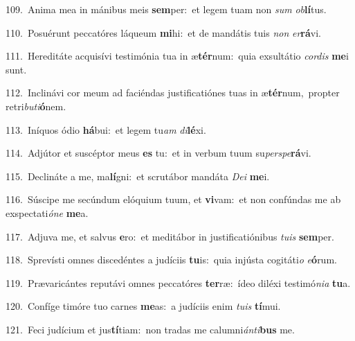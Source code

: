 {\numbfont\textcolor{\numbcolor}{109.}}~Anima mea in mánibus meis \textbf{sem}\-per:~\star et legem tuam non \textit{sum} \textit{ob}\-\textbf{lí}tus.\par
{\numbfont\textcolor{\numbcolor}{110.}}~Posuérunt peccatóres láqueum \textbf{mi}\-hi:~\star et de mandátis tuis \textit{non} \textit{er}\-\textbf{rá}vi.\par
{\numbfont\textcolor{\numbcolor}{111.}}~Hereditáte acquisívi testimónia tua in æ\-\textbf{tér}\-num:~\star quia exsultátio \textit{cor}\-\textit{dis} \textbf{me}\-i sunt.\par
{\numbfont\textcolor{\numbcolor}{112.}}~Inclinávi cor meum ad faciéndas justificatiónes tuas in æ\-\textbf{tér}\-num,~\star propter retri\-\textit{bu}\-\textit{ti}\textbf{ó}nem.\par
{\numbfont\textcolor{\numbcolor}{113.}}~Iníquos ódio \textbf{há}\-bui:~\star et legem tu\textit{am} \textit{di}\-\textbf{lé}xi.\par
{\numbfont\textcolor{\numbcolor}{114.}}~Adjútor et suscéptor meus \textbf{es} tu:~\star et in verbum tuum su\-\textit{per}\-\textit{spe}\textbf{rá}vi.\par
{\numbfont\textcolor{\numbcolor}{115.}}~Declináte a me, ma\-\textbf{lí}\-gni:~\star et scrutábor mandáta \textit{De}\-\textit{i} \textbf{me}\-i.\par
{\numbfont\textcolor{\numbcolor}{116.}}~Súscipe me secúndum elóquium tuum, et \textbf{vi}\-vam:~\star et non confúndas me ab exspectati\-\textit{ó}\-\textit{ne} \textbf{me}\-a.\par
{\numbfont\textcolor{\numbcolor}{117.}}~Adjuva me, et salvus \textbf{e}\-ro:~\star et meditábor in justificatiónibus \textit{tu}\-\textit{is} \textbf{sem}\-per.\par
{\numbfont\textcolor{\numbcolor}{118.}}~Sprevísti omnes discedéntes a judíciis \textbf{tu}\-is:~\star quia injústa cogitáti\textit{o} \textit{e}\-\textbf{ó}rum.\par
{\numbfont\textcolor{\numbcolor}{119.}}~Prævaricántes reputávi omnes peccatóres \textbf{ter}\-ræ:~\star ídeo diléxi testimó\-\textit{ni}\-\textit{a} \textbf{tu}\-a.\par
{\numbfont\textcolor{\numbcolor}{120.}}~Confíge timóre tuo carnes \textbf{me}\-as:~\star a judíciis enim \textit{tu}\-\textit{is} \textbf{tí}\-mui.\par
{\numbfont\textcolor{\numbcolor}{121.}}~Feci judícium et jus\-\textbf{tí}\-tiam:~\star non tradas me calumni\-\textit{án}\-\textit{ti}\textbf{bus} me.\par
